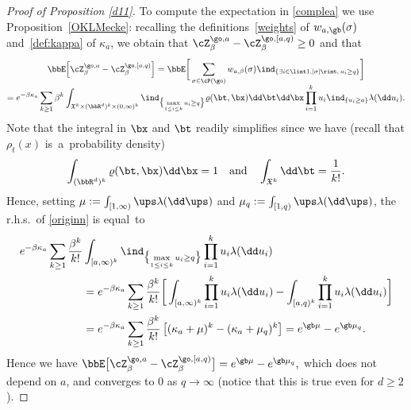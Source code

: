 \begin{proof}[Proof of Proposition \ref{d11}]
To compute the expectation in \eqref{complea} we use
Proposition~\ref{OKLMecke}:
recalling the definitions~\eqref{weights} of $w_{a,\gb}(\sigma)$ and~\eqref{def:kappa} of $\kappa_a$, we obtain that
$ \cZ^{\go,a}_{\beta}- \cZ^{\go,[a,q)}_{\beta} \geq 0$ and that\vspace*{-5pt}
\begin{multline}\label{originn}
\bbE \Bigl[ \cZ^{\go,a}_{\beta}- \cZ^{\go,[a,q)}_{\beta} \Bigr] =
\bbE \bigg[ \sum_{\sigma \in \cP(\go)} w_{a,\beta}(\sigma) \ind_{\{\exists i\in \lint 1, |\sigma|\rint,\, u_i\ge q\}} \bigg]\\[-5pt]
= e^{-\beta \kappa_a} \sum_{k\ge 1} \beta^k \int_{\mathfrak{X}^k\times (\bbR^d)^k \times (0,\infty)^k}\ind_{\bigl\{ \max\limits_{1\le i\le k} u_i \geq q\bigr\}} \varrho(\bt,\bx) \dd \bt \dd \bx \prod_{i=1}^{k} u_i \ind_{\{u_i\ge a\}} \lambda(\dd u_i).
\end{multline}
Note that the integral in $\bx$ and $\bt$ readily simplifies since we have (recall that $\rho_t(x)$ is~a~probability density)
\begin{equation}\label{denzit}
\int_{(\bbR^d)^k}\varrho(\bt,\bx) \dd \bx = 1
\quad \text{and} \quad
\int_{\mathfrak{X}^k} \dd \bt= \frac{1}{k!}.
\end{equation}
Hence, setting $\mu:=\int_{[1,\infty)} \ups \lambda(\dd \ups)$
and $ \mu_q:=\int_{[1,q)} \ups \lambda(\dd \ups)$,
the r.h.s.\ of \eqref{originn} is equal~to%
\begin{equation}
\label{kalkul}
\begin{split}
e^{-\beta \kappa_a} \sum_{k\ge 1} \frac{\beta^k }{k!}
& \int_{[a,\infty)^k} \ind_{\bigl\{ \max\limits_{1\le i\le k} u_i\geq q\bigr\}} \prod_{i=1}^{k} u_i \lambda(\dd u_i) \\
& = e^{-\beta \kappa_a} \sum_{k\ge 1} \frac{\beta^k }{k!}
\bigg[\int_{[a,\infty)^k} \prod_{i=1}^{k} u_i \lambda(\dd u_i) -\int_{[a,q)^k} \prod_{i=1}^{k} u_i \lambda(\dd u_i)\bigg] \\
& = e^{-\beta \kappa_a} \sum_{k\ge 1} \frac{\beta^k }{k!} \left[(\kappa_a+\mu)^k-(\kappa_a+\mu_q)^k\right] = e^{\gb \mu} -e^{\gb \mu_q}.
\end{split}
\end{equation}
Hence we have
$
\bbE \bigl[ \cZ^{\go,a}_{\beta}- \cZ^{\go,[a,q)}_{\beta} \bigr] = e^{\gb \mu} -e^{\gb \mu_q},
$
which does not depend on $a$, and converges to $0$ as $q\to\infty$ (notice that this is true even for $d\geq 2$).


\end{proof}
